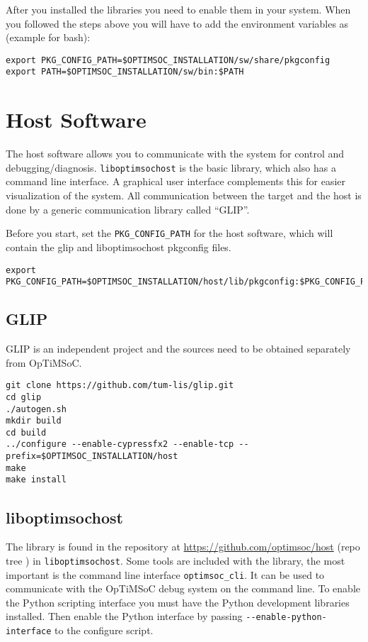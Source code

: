 After you installed the libraries you need to enable them in your
system. When you followed the steps above you will have to add the
environment variables as (example for bash):

\begin{lstlisting}
export PKG_CONFIG_PATH=$OPTIMSOC_INSTALLATION/sw/share/pkgconfig
export PATH=$OPTIMSOC_INSTALLATION/sw/bin:$PATH
\end{lstlisting}

\section{Host Software}

The host software allows you to communicate with the system for
control and debugging/diagnosis. \verb|liboptimsochost| is the basic
library, which also has a command line interface. A graphical user
interface complements this for easier visualization of the system. All
communication between the target and the host is done by a generic communication
library called ``GLIP''.

Before you start, set the \verb|PKG_CONFIG_PATH| for the host software, which
will contain the glip and liboptimsochost pkgconfig files.

\begin{lstlisting}
export PKG_CONFIG_PATH=$OPTIMSOC_INSTALLATION/host/lib/pkgconfig:$PKG_CONFIG_PATH
\end{lstlisting}

\subsection{GLIP}

GLIP is an independent project and the sources need to be obtained separately
from OpTiMSoC.

\begin{lstlisting}
git clone https://github.com/tum-lis/glip.git
cd glip
./autogen.sh
mkdir build
cd build
../configure --enable-cypressfx2 --enable-tcp --prefix=$OPTIMSOC_INSTALLATION/host
make
make install
\end{lstlisting}

\subsection{liboptimsochost}

The library is found in the repository at
\url{https://github.com/optimsoc/host} (repo tree ) in
\verb|liboptimsochost|.  Some tools are included with the library, the
most important is the command line interface \verb|optimsoc_cli|. It
can be used to communicate with the OpTiMSoC debug system on the
command line. To enable the Python scripting interface you must have the Python
development libraries installed. Then enable the Python interface by passing
\verb|--enable-python-interface| to the configure script.

